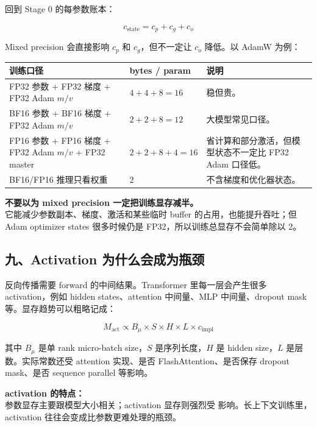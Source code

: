 回到 Stage 0 的每参数账本：

\[
c_{\text{state}} = c_p + c_g + c_o
\]

Mixed precision 会直接影响 $c_p$ 和 $c_g$，但不一定让 $c_o$ 降低。以 AdamW 为例：

\begin{center}
{\small
\begin{tabular}{p{4.2cm}p{4.1cm}p{4.2cm}}
\hline
\textbf{训练口径} & \textbf{bytes / param} & \textbf{说明} \\
\hline
FP32 参数 + FP32 梯度 + FP32 Adam $m/v$ & $4 + 4 + 8 = 16$ & 稳但贵。 \\
BF16 参数 + BF16 梯度 + FP32 Adam $m/v$ & $2 + 2 + 8 = 12$ & 大模型常见口径。 \\
FP16 参数 + FP16 梯度 + FP32 Adam $m/v$ + FP32 master & $2 + 2 + 8 + 4 = 16$ & 省计算和部分激活，但模型状态不一定比 FP32 Adam 口径低。 \\
BF16/FP16 推理只看权重 & $2$ & 不含梯度和优化器状态。 \\
\hline
\end{tabular}
}
\end{center}

\begin{warnbox}
\textbf{不要以为 mixed precision 一定把训练显存减半。}\\
它能减少参数副本、梯度、激活和某些临时 buffer 的占用，也能提升吞吐；但 Adam optimizer states 很多时候仍是 FP32，所以训练总显存不会简单除以 2。
\end{warnbox}

\subsection{九、Activation 为什么会成为瓶颈}

反向传播需要 forward 的中间结果。Transformer 里每一层会产生很多 activation，例如 hidden states、attention 中间量、MLP 中间量、dropout mask 等。显存趋势可以粗略记成：

\[
M_{\text{act}}
\propto
B_{\mu} \times S \times H \times L \times c_{\text{impl}}
\]

其中 $B_{\mu}$ 是单 rank micro-batch size，$S$ 是序列长度，$H$ 是 hidden size，$L$ 是层数。实际常数还受 attention 实现、是否 FlashAttention、是否保存 dropout mask、是否 sequence parallel 等影响。

\begin{intubox}
\textbf{activation 的特点：}\\
参数显存主要跟模型大小相关；activation 显存则强烈受  影响。长上下文训练里，activation 往往会变成比参数更难处理的瓶颈。
\end{intubox}

